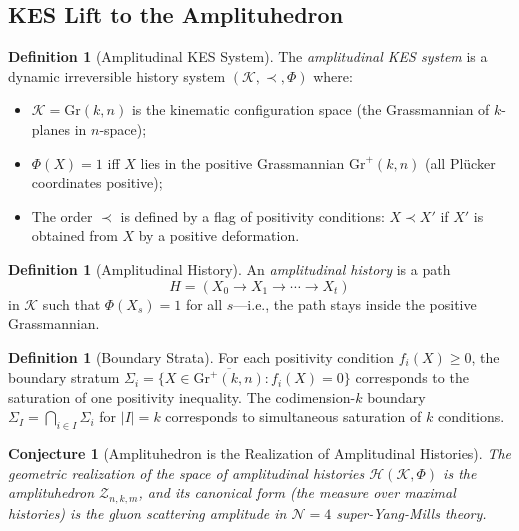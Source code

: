\documentclass[12pt, oneside]{amsart}
\theoremstyle{plain}
\newtheorem{conjecture}[theorem]{Conjecture}
\theoremstyle{definition}
\newtheorem{definition}[theorem]{Definition}
\theoremstyle{remark}
\newcommand{\Phif}{\Phi}   %
\begin{document}
\subsection{KES Lift to the Amplituhedron}

\begin{definition}[Amplitudinal KES System]
The \emph{amplitudinal KES system} is a dynamic irreversible history system $(\mathcal{K}, \prec, \Phif)$ where:
\begin{itemize}[noitemsep]
  \item $\mathcal{K} = \mathrm{Gr}(k,n)$ is the kinematic configuration space (the Grassmannian of $k$-planes in $n$-space);
  \item $\Phif(X) = 1$ iff $X$ lies in the positive Grassmannian $\mathrm{Gr}^+(k,n)$ (all Pl\"{u}cker coordinates positive);
  \item The order $\prec$ is defined by a flag of positivity conditions: $X \prec X'$ if $X'$ is obtained from $X$ by a positive deformation.
\end{itemize}
\end{definition}

\begin{definition}[Amplitudinal History]
An \emph{amplitudinal history} is a path
\[
  H = (X_0 \to X_1 \to \cdots \to X_t)
\]
in $\mathcal{K}$ such that $\Phif(X_s) = 1$ for all $s$---i.e., the path stays inside the positive Grassmannian.
\end{definition}

\begin{definition}[Boundary Strata]
For each positivity condition $f_i(X) \geq 0$, the boundary stratum $\Sigma_i = \{X \in \overline{\mathrm{Gr}^+(k,n)} : f_i(X) = 0\}$ corresponds to the saturation of one positivity inequality. The codimension-$k$ boundary $\Sigma_I = \bigcap_{i \in I} \Sigma_i$ for $|I| = k$ corresponds to simultaneous saturation of $k$ conditions.
\end{definition}

\begin{conjecture}[Amplituhedron is the Realization of Amplitudinal Histories]
\label{conj:amplituhedron}
The geometric realization of the space of amplitudinal histories $\mathcal{H}(\mathcal{K}, \Phif)$ is the amplituhedron $\mathcal{Z}_{n,k,m}$, and its canonical form (the measure over maximal histories) is the gluon scattering amplitude in $\mathcal{N}=4$ super-Yang-Mills theory.
\end{conjecture}
\end{document}
